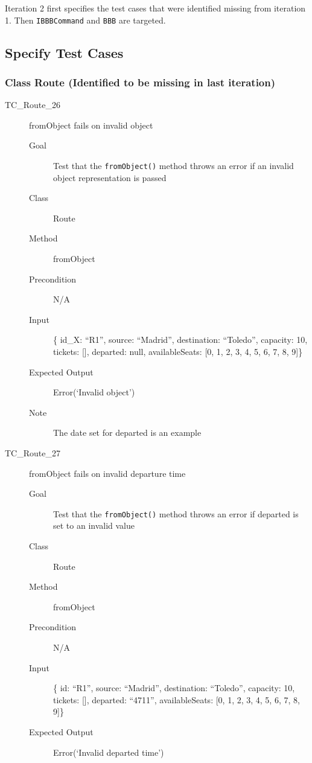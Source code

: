 \documentclass[11pt]{article}
\begin{document}
Iteration 2 first specifies the test cases that were identified missing from iteration 1. Then \texttt{IBBBCommand} and \texttt{BBB} are targeted.

\subsection{Specify Test Cases}
\label{sec:org0b219ed}

\subsubsection{Class Route (Identified to be missing in last iteration)}
\label{sec:org19684bf}

\begin{description}
\item[{TC\_Route\_26}] fromObject fails on invalid object
\begin{description}
\item[{Goal}] Test that the \texttt{fromObject()} method throws an error if an invalid object representation is passed
\item[{Class}] Route
\item[{Method}] fromObject
\item[{Precondition}] N/A
\item[{Input}] \{ id\_X: “R1”, source: “Madrid”, destination: “Toledo”, capacity: 10,  tickets: [], departed: null, availableSeats: [0, 1, 2, 3, 4, 5, 6, 7, 8, 9]\}
\item[{Expected Output}] Error(‘Invalid object’)
\item[{Note}] The date set for departed is an example
\end{description}

\item[{TC\_Route\_27}] fromObject fails on invalid departure time
\begin{description}
\item[{Goal}] Test that the \texttt{fromObject()} method throws an error if departed is set to an invalid value
\item[{Class}] Route
\item[{Method}] fromObject
\item[{Precondition}] N/A
\item[{Input}] \{ id: “R1”, source: “Madrid”, destination: “Toledo”, capacity: 10,  tickets: [], departed: “4711”, availableSeats: [0, 1, 2, 3, 4, 5, 6, 7, 8, 9]\}
\item[{Expected Output}] Error(‘Invalid departed time’)
\end{description}
\end{description}
\end{document}
